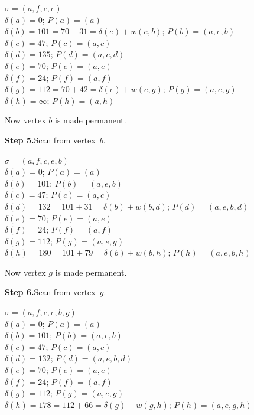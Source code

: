 \medskip
$\sigma=(a,f,c,e)$\\
$\delta(a)=0$; $P(a)=(a)$\\
$\delta(b)=101=70+31= \delta(e)+w(e,b)$; $P(b)=(a,e,b)$\quad{}\\
$\delta(c)=47$; $P(c)=(a,c)$\\
$\delta(d)=135$; $P(d)=(a,c,d)$\\
$\delta(e)=70$; $P(e)=(a,e)$\\
$\delta(f)=24$; $P(f)=(a,f)$\\
$\delta(g)=112=70+42= \delta(e)+w(e,g)$; $P(g)=(a,e,g)$\quad{}\\
$\delta(h)=\infty$; $P(h)=(a,h)$\\

\endgroup

Now vertex $b$ is made permanent.

\medskip
\textbf{Step 5.}\quad Scan from vertex~$b$.

\begingroup
{}
\rightskip\leftskip

\medskip
$\sigma=(a,f,c,e,b)$\\
$\delta(a)=0$; $P(a)=(a)$\\
$\delta(b)=101$; $P(b)=(a,e,b)$\\
$\delta(c)=47$; $P(c)=(a,c)$\\
$\delta(d)= 132 = 101+ 31= \delta(b)+w(b,d)$; $P(d)=(a,e,b,d)$\quad{}\\
$\delta(e)= 70$; $P(e)=(a,e)$\\
$\delta(f)= 24$; $P(f)=(a,f)$\\
$\delta(g)=112$; $P(g)=(a,e,g)$\\
$\delta(h)=180 = 101+79=\delta(b)+w(b,h)$; $P(h)=(a,e,b,h)$\quad{}\\

\endgroup

Now vertex $g$ is made permanent.

\medskip
\textbf{Step 6.}\quad Scan from vertex~$g$.

\begingroup
{}
\rightskip\leftskip

\medskip
$\sigma=(a,f,c,e,b,g)$\\
$\delta(a)=0$; $P(a)=(a)$\\
$\delta(b)=101$; $P(b)=(a,e,b)$\\
$\delta(c)=47$; $P(c)=(a,c)$\\
$\delta(d)= 132$; $P(d)=(a,e,b,d)$\\
$\delta(e)=70$; $P(e)=(a,e)$\\
$\delta(f)=24$; $P(f)=(a,f)$\\
$\delta(g)=112$; $P(g)=(a,e,g)$\\
$\delta(h)=178 = 112+66=\delta(g)+w(g,h)$; $P(h)=(a,e,g,h)$\quad{}\\

